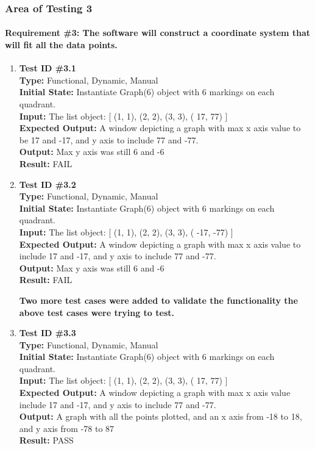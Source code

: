 \documentclass[12pt, titlepage]{article}
\begin{document}
\subsubsection{Area of Testing 3}		
	\paragraph{Requirement \#3: The software will construct a coordinate system that will fit all the data points.}
		\begin{enumerate}
		\label{sec:3.1}
			\item{\textbf{Test ID \#3.1\\}}
			\textbf{Type:} Functional, Dynamic, Manual\\
			\textbf{Initial State:} Instantiate Graph(6) object with 6 markings on each quadrant. \\
			\textbf{Input:} The list object: [ (1, 1),  (2, 2), (3, 3), ( 17, 77) ]\\
			\textbf{Expected Output:}  A window depicting a graph with max x axis value to be 17 and -17, and y axis to include 77 and -77. \\
			\textbf{Output:}	Max y axis was still 6 and -6\\
			\textbf{Result:} FAIL
		\label{sec:3.2}					
			\item{\textbf{Test ID \#3.2\\}}
			\textbf{Type:} Functional, Dynamic, Manual\\
			\textbf{Initial State:}  Instantiate Graph(6) object with 6 markings on each quadrant.\\
			\textbf{Input:} The list object: [ (1, 1),  (2, 2), (3, 3), ( -17, -77) ]\\
			\textbf{Expected Output:} A window depicting a graph with max x axis value to include 17 and -17, and y axis to include 77 and -77. \\
			\textbf{Output:}	Max y axis was still 6 and -6\\
			\textbf{Result:} FAIL

			\textbf{Two more test cases were added to validate the functionality the above test cases were trying to test.}
					
			\item{\textbf{Test ID \#3.3\\}}
			\textbf{Type:} Functional, Dynamic, Manual\\
			\textbf{Initial State:} Instantiate Graph(6) object with 6 markings on each quadrant. \\
			\textbf{Input:} The list object: [ (1, 1),  (2, 2), (3, 3), ( 17, 77) ]\\
			\textbf{Expected Output:} A window depicting a graph with max x axis value include 17 and -17, and y axis to include 77 and -77. \\
			\textbf{Output:}	A graph with all the points plotted, and an x axis from -18 to 18, and y axis from -78 to 87\\
			\textbf{Result:} PASS
								

\end{enumerate}
\end{document}
